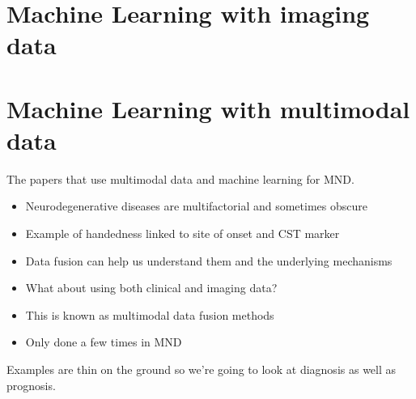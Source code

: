 \section{Machine Learning with imaging data}


\section{Machine Learning with multimodal data}

The papers that use multimodal data and machine learning for MND.
\begin{itemize}
    \item Neurodegenerative diseases are multifactorial and sometimes obscure
    \item Example of handedness linked to site of onset and CST marker
    \item Data fusion can help us understand them and the underlying mechanisms
    \item What about using both clinical and imaging data?
    \item This is known as multimodal data fusion methods
    \item Only done a few times in MND
\end{itemize}

Examples are thin on the ground so we're going to look at diagnosis as well as prognosis.



